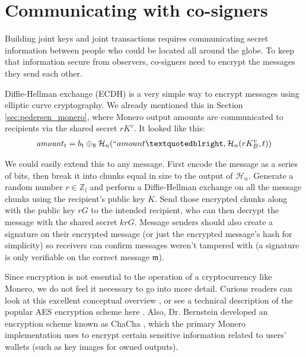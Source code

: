 \section{Communicating with co-signers}
\label{sec:communicating}

Building joint keys and joint transactions requires communicating secret information between people who could be located all around the globe. To keep that information secure from observers, co-signers need to encrypt the messages they send each other.

Diffie-Hellman exchange (ECDH) is a very simple way to encrypt messages using elliptic curve cryptography. We already mentioned this in Section \ref{sec:pedersen_monero}, where Monero output amounts are communicated to recipients via the shared secret $r K^v$. It looked like this:\vspace{.175cm}
\begin{align*}
  \mathit{amount}_t = b_t \oplus_8 \mathcal{H}_n(``amount”, \mathcal{H}_n(r K_B^v, t))
\end{align*}

We could easily extend this to any message. First encode the message as a series of bits, then break it into chunks equal in size to the output of $\mathcal{H}_n$. Generate a random number $r \in \mathbb{Z}_l$ and perform a Diffie-Hellman exchange on all the message chunks using the recipient's public key $K$. Send those encrypted chunks along with the public key $r G$ to the intended recipient, who can then decrypt the message with the shared secret $k r G$. Message senders should also create a signature on their encrypted message (or just the encrypted message's hash for simplicity) so receivers can confirm messages weren't tampered with (a signature is only verifiable on the correct message $\mathfrak{m}$).

Since encryption is not essential to the operation of a cryptocurrency like Monero, we do not feel it necessary to go into more detail. Curious readers can look at this excellent conceptual overview \cite{tutorialspoint-cryptography}, or see a technical description of the popular AES encryption scheme here \cite{AES-encryption}. Also, Dr. Bernstein developed an encryption scheme known as ChaCha \cite{Bernstein_chacha,chacha-irtf}, which the primary Monero implementation uses to encrypt certain sensitive information related to users' wallets (such as key images for owned outputs).



